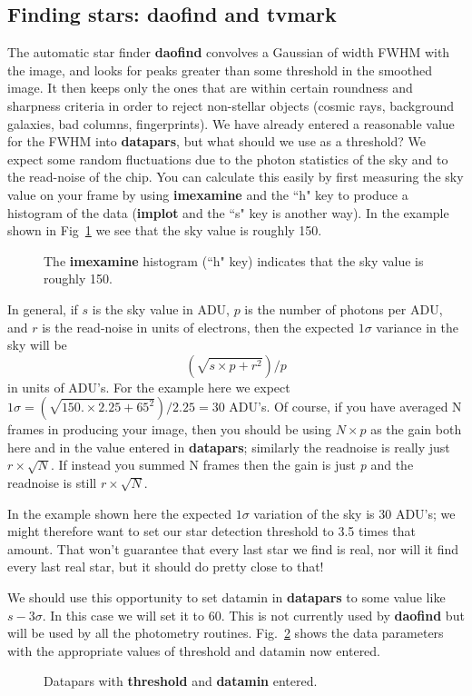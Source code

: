 \subsection{Finding stars: {\bf daofind} and {\bf tvmark} }
The automatic star finder {\bf daofind} convolves a Gaussian of
width FWHM with the image, and looks for peaks greater than some
threshold in the smoothed image.  It then keeps only the ones that are
within certain roundness and sharpness criteria in order to reject
non-stellar objects (cosmic rays, background galaxies, bad columns,
fingerprints).  We have already entered a reasonable value for the FWHM
into {\bf datapars}, but what should we use as a threshold?  We expect
some random fluctuations due to the photon statistics of the sky
and to the read-noise of the chip. You can calculate this easily by
first
measuring the sky value on your frame by
using {\bf imexamine} and the ``h" key to produce a histogram of
the data ({\bf implot} and the ``s" key is another way).  In the example
shown in Fig~\ref{hist} we see that the sky value is roughly 150.
\begin{figure}
\vspace{3.6in}
\caption{\label{hist} The {\bf imexamine} histogram (``h" key) indicates
that the sky value is roughly 150.}
\end{figure}
In general, if $s$ is the sky value in ADU, $p$ is the number of
photons per ADU, and $r$ is the read-noise in units of electrons,
then the expected $1\sigma$ variance in the sky
will be 
$$\left(\sqrt{s\times p + r^2}\right)/p$$ 
in units of ADU's.  For the example here we expect
$1\sigma=\left(\sqrt{150.\times 2.25 + 65^2}\right)/2.25=30$ ADU's.
Of course, if you have averaged N frames in producing your image,
then you should be using
$N\times p$ as the gain both here and in the value entered in
{\bf datapars}; similarly the readnoise is really just $r \times \sqrt{N}$.
If instead you summed N frames then the gain is just {\it p} and the
readnoise is still $r\times \sqrt{N}$.
 
In the example shown here the expected $1\sigma$ variation of the sky is
30 ADU's; we might therefore want to set our star detection threshold to
3.5 times that amount.  That won't guarantee that every last star we
find is real, nor will it find every last real star, but it should do
pretty close to that!
 
We should use this opportunity to set datamin in {\bf
datapars} to some value like $s-3\sigma$.  In this case we will set it
to 60.  This is not currently used by {\bf daofind} but will be used
by all the photometry routines.  Fig.~\ref{ndatapars} shows the data
parameters with the appropriate values of threshold and datamin now
entered.
\begin{figure}
\vspace{3.0in}
\caption{\label{ndatapars}  Datapars with {\bf threshold} and {\bf datamin}
entered.} 
\end{figure}
 
